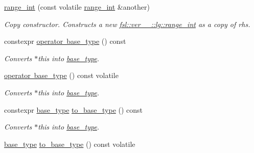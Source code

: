 \begin{DoxyCompactItemize}
\mbox{\label{classfsl_1_1ver__1__0_1_1lg_1_1range__int_ad9f1cb92a0ad431eb59f15f207329e48}} 
\mbox{\hyperlink{classfsl_1_1ver__1__0_1_1lg_1_1range__int_ad9f1cb92a0ad431eb59f15f207329e48}{range\+\_\+int}} (const volatile \mbox{\hyperlink{classfsl_1_1ver__1__0_1_1lg_1_1range__int}{range\+\_\+int}} \&another)
\begin{DoxyCompactList}\small\item\em Copy constructor. Constructs a new \mbox{\hyperlink{classfsl_1_1ver__1__0_1_1lg_1_1range__int}{fsl\+::ver\+\_\+\_\+::lg\+::range\+\_\+int}} as a copy of {\itshape rhs}. \end{DoxyCompactList}\item 
constexpr \mbox{\hyperlink{classfsl_1_1ver__1__0_1_1lg_1_1range__int_a0b4a2f845550553abc83cbe4c6203403}{operator base\+\_\+type}} () const
\begin{DoxyCompactList}\small\item\em Converts $\ast$this into \mbox{\hyperlink{classfsl_1_1ver__1__0_1_1lg_1_1range__int_aa6c763f6d72d18c8b9129c0c06628cd3}{base\+\_\+type}}. \end{DoxyCompactList}\item 
\mbox{\hyperlink{classfsl_1_1ver__1__0_1_1lg_1_1range__int_a3f3fcff2153745e175aecde28cac6aef}{operator base\+\_\+type}} () const volatile
\begin{DoxyCompactList}\small\item\em Converts $\ast$this into \mbox{\hyperlink{classfsl_1_1ver__1__0_1_1lg_1_1range__int_aa6c763f6d72d18c8b9129c0c06628cd3}{base\+\_\+type}}. \end{DoxyCompactList}\item 
constexpr \mbox{\hyperlink{classfsl_1_1ver__1__0_1_1lg_1_1range__int_aa6c763f6d72d18c8b9129c0c06628cd3}{base\+\_\+type}} \mbox{\hyperlink{classfsl_1_1ver__1__0_1_1lg_1_1range__int_af7d701628aa12325db4b137df7af0973}{to\+\_\+base\+\_\+type}} () const
\begin{DoxyCompactList}\small\item\em Converts $\ast$this into \mbox{\hyperlink{classfsl_1_1ver__1__0_1_1lg_1_1range__int_aa6c763f6d72d18c8b9129c0c06628cd3}{base\+\_\+type}}. \end{DoxyCompactList}\item 
\mbox{\hyperlink{classfsl_1_1ver__1__0_1_1lg_1_1range__int_aa6c763f6d72d18c8b9129c0c06628cd3}{base\+\_\+type}} \mbox{\hyperlink{classfsl_1_1ver__1__0_1_1lg_1_1range__int_a3bd257f95d32d31711637af7eca06515}{to\+\_\+base\+\_\+type}} () const volatile

\end{DoxyCompactItemize}
